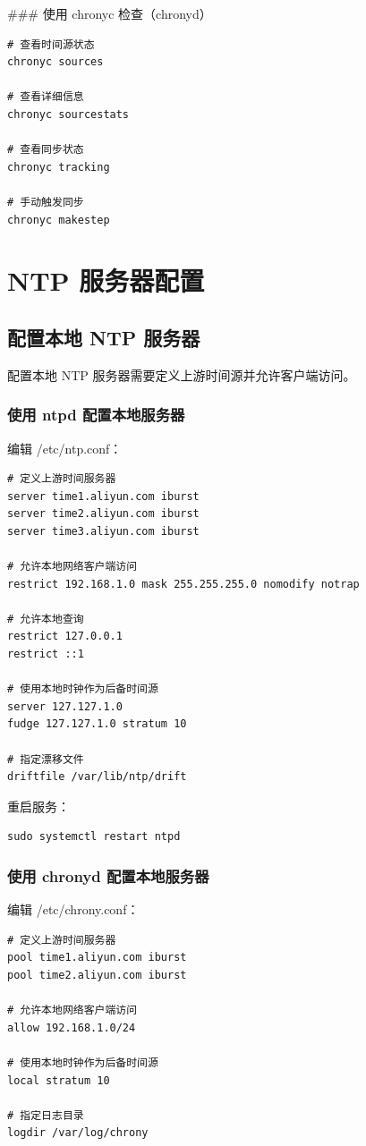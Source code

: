 \documentclass[12pt,UTF8]{ctexbook}
\begin{document}
### 使用 chronyc 检查（chronyd）

\begin{verbatim}
# 查看时间源状态
chronyc sources

# 查看详细信息
chronyc sourcestats

# 查看同步状态
chronyc tracking

# 手动触发同步
chronyc makestep
\end{verbatim}

\chapter{NTP 服务器配置}
\label{chap:ntp_server}

\section{配置本地 NTP 服务器}
\label{sec:configure_local_server}

配置本地 NTP 服务器需要定义上游时间源并允许客户端访问。

\subsection{使用 ntpd 配置本地服务器}

编辑 /etc/ntp.conf：
\begin{verbatim}
# 定义上游时间服务器
server time1.aliyun.com iburst
server time2.aliyun.com iburst
server time3.aliyun.com iburst

# 允许本地网络客户端访问
restrict 192.168.1.0 mask 255.255.255.0 nomodify notrap

# 允许本地查询
restrict 127.0.0.1
restrict ::1

# 使用本地时钟作为后备时间源
server 127.127.1.0
fudge 127.127.1.0 stratum 10

# 指定漂移文件
driftfile /var/lib/ntp/drift
\end{verbatim}

重启服务：
\begin{verbatim}
sudo systemctl restart ntpd
\end{verbatim}

\subsection{使用 chronyd 配置本地服务器}

编辑 /etc/chrony.conf：
\begin{verbatim}
# 定义上游时间服务器
pool time1.aliyun.com iburst
pool time2.aliyun.com iburst

# 允许本地网络客户端访问
allow 192.168.1.0/24

# 使用本地时钟作为后备时间源
local stratum 10

# 指定日志目录
logdir /var/log/chrony
\end{verbatim}
\end{document}
